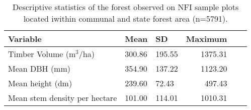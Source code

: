 
\begin{table}[ht]
	\centering
	\caption{Descriptive statistics of the forest observed on NFI sample plots located iwithin communal and state forest area (n=5791).}
	\label{tab:fieldata}
	\begin{tabular}{lllrrr}
		\hline
		Variable & Mean & SD & Maximum \\ 
		\hline
Timber Volume (m$^3$/ha) & 300.86 & 195.55 & 1375.31 \\
Mean DBH (mm) & 354.90 & 137.22 & 1123.20 \\
Mean height (dm) & 239.60 & 72.43 & 497.43 \\
Mean stem density per hectare & 101.00  & 114.01 & 1010.31 \\
\hline
\hline
\end{tabular}
\end{table}